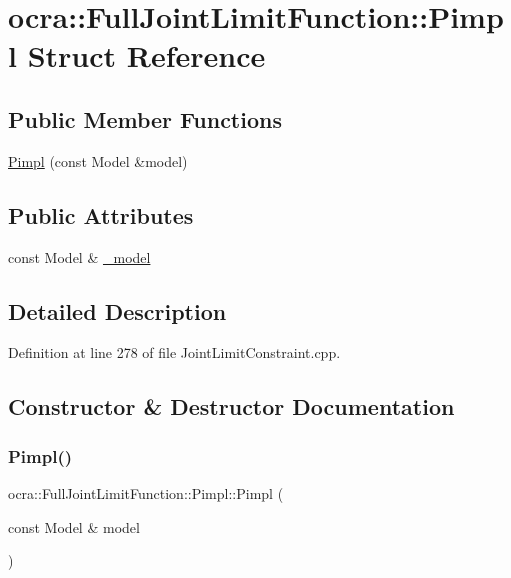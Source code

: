 \hypertarget{structFullJointLimitFunction_1_1Pimpl}{}\section{ocra\+:\+:Full\+Joint\+Limit\+Function\+:\+:Pimpl Struct Reference}
\label{structFullJointLimitFunction_1_1Pimpl}
\subsection*{Public Member Functions}
\begin{DoxyCompactItemize}
\item 
\hyperlink{structFullJointLimitFunction_1_1Pimpl_aa3d5e5c11c4204da38bb6086315e22d8}{Pimpl} (const Model \&model)
\end{DoxyCompactItemize}
\subsection*{Public Attributes}
\begin{DoxyCompactItemize}
\item 
const Model \& \hyperlink{structFullJointLimitFunction_1_1Pimpl_a1405a83bd59c5c592bec3e5ec1f394ca}{\+\_\+model}
\end{DoxyCompactItemize}


\subsection{Detailed Description}


Definition at line 278 of file Joint\+Limit\+Constraint.\+cpp.



\subsection{Constructor \& Destructor Documentation}
\hypertarget{structFullJointLimitFunction_1_1Pimpl_aa3d5e5c11c4204da38bb6086315e22d8}{}\label{structFullJointLimitFunction_1_1Pimpl_aa3d5e5c11c4204da38bb6086315e22d8} 
\subsubsection{\texorpdfstring{Pimpl()}{Pimpl()}}
{\footnotesize\ttfamily ocra\+::\+Full\+Joint\+Limit\+Function\+::\+Pimpl\+::\+Pimpl (\begin{DoxyParamCaption}\item[{const Model \&}]{model }\end{DoxyParamCaption})\hspace{0.3cm}{\ttfamily [inline]}}



